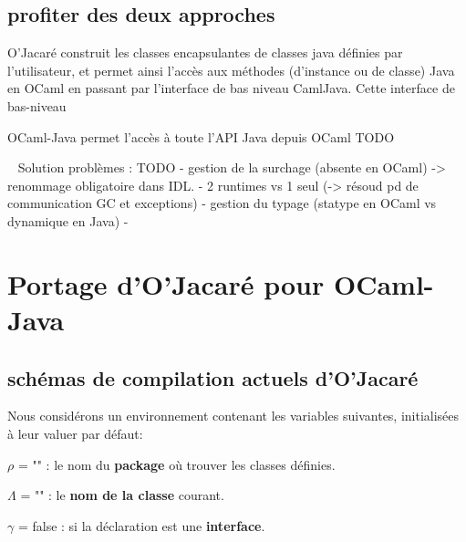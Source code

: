 \documentclass[a4paper, 11pt, notitlepage]{article}
\begin{document}

\subsection{profiter des deux approches}
O'Jacaré construit les classes encapsulantes de classes
java définies par l'utilisateur, et permet ainsi l'accès aux méthodes
(d'instance ou de classe) Java en OCaml en passant par l'interface de bas niveau CamlJava.
Cette interface de bas-niveau 

OCaml-Java permet l'accès à toute l'API Java depuis OCaml TODO


\ 
\newline
Solution problèmes : TODO
- gestion de la surchage (absente en OCaml) -> renommage obligatoire
dans IDL.
- 2 runtimes vs 1 seul (-> résoud pd de communication GC et exceptions)
- gestion du typage (statype en OCaml vs dynamique en Java)
-










\section{Portage d'O'Jacaré pour OCaml-Java}


\subsection{}





\subsection{schémas de compilation actuels d'O'Jacaré}

\noindent
Nous considérons un environnement contenant les  variables suivantes, initialisées à leur valuer par défaut: 

$\rho$ = "" : le nom du \textbf{package} où trouver les classes définies.

$\Lambda$ = "" : le \textbf{nom de la classe} courant.

$\gamma$ = false : si la déclaration est une \textbf{interface}.
\end{document}
